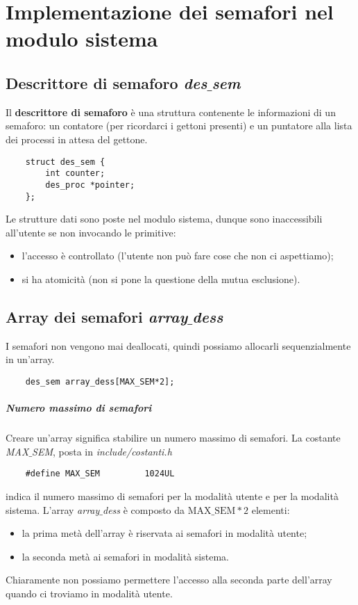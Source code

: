 
\chapter{Implementazione dei semafori nel modulo sistema}

\section{Descrittore di semaforo \emph{des$\_$sem}}
Il \textbf{descrittore di semaforo} è una struttura contenente le informazioni di un semaforo: un contatore (per ricordarci i gettoni presenti) e un puntatore alla lista dei processi in attesa del gettone. 	
\begin{verbatim}
	struct des_sem {
		int counter;
		des_proc *pointer;	
	};
\end{verbatim}
Le strutture dati sono poste nel modulo sistema, dunque sono inaccessibili all'utente se non invocando le primitive:
\begin{itemize}
	\item l'accesso è controllato (l'utente non può fare cose che non ci aspettiamo);
	\item si ha atomicità (non si pone la questione della mutua esclusione).
\end{itemize} 
\section{Array dei semafori \emph{array$\_$dess}} 
I semafori non vengono mai deallocati, quindi possiamo allocarli sequenzialmente in un'array.
\begin{verbatim}
	des_sem array_dess[MAX_SEM*2];
\end{verbatim}
\paragraph{Numero massimo di semafori} Creare un'array significa stabilire un numero massimo di semafori. La costante \emph{MAX$\_$SEM}, posta in \emph{include/costanti.h}
\begin{verbatim}
	#define MAX_SEM         1024UL
\end{verbatim}
indica il numero massimo di semafori per la modalità utente e per la modalità sistema. L'array \emph{array$\_$dess} è composto da $\text{MAX$\_$SEM}*2$ elementi:
\begin{itemize}
	\item la prima metà dell'array è riservata ai semafori in modalità utente;
	\item la seconda metà ai semafori in modalità sistema.
\end{itemize}
Chiaramente non possiamo permettere l'accesso alla seconda parte dell'array quando ci troviamo in modalità utente. 
